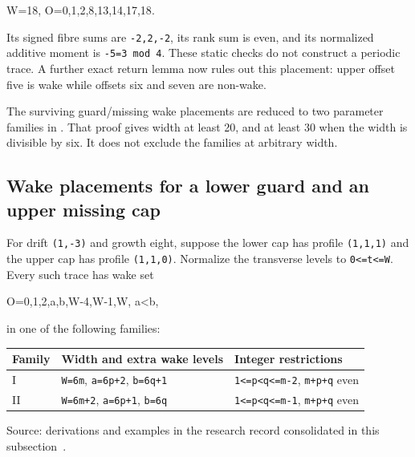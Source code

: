 \documentclass[11pt,letterpaper]{article}
\theoremstyle{plain}
\theoremstyle{definition}
\begin{document}
\begin{NoHyper}
\begin{codeblock}
W=18,       O={0,1,2,8,13,14,17,18}.
\end{codeblock}

Its signed fibre sums are \texttt{-2,2,-2}, its rank sum is even, and its normalized additive moment is \texttt{-5=3\ mod\ 4}. These static checks do not construct a periodic trace. A further exact return lemma now rules out this placement: upper offset five is wake while offsets six and seven are non-wake.

The surviving guard/missing wake placements are reduced to two parameter families in . That proof gives width at least 20, and at least 30 when the width is divisible by six. It does not exclude the families at arbitrary width.


\subsection{Wake placements for a lower guard and an upper missing cap}

For drift \texttt{(1,-3)} and growth eight, suppose the lower cap has profile \texttt{(1,1,1)} and the upper cap has profile \texttt{(1,1,0)}. Normalize the transverse levels to \texttt{0\textless{}=t\textless{}=W}. Every such trace has wake set

\begin{codeblock}
O={0,1,2,a,b,W-4,W-1,W},       a<b,
\end{codeblock}

in one of the following families:

{\def\LTcaptype{table} %
\begin{longtable}[]{@{}lll@{}}
\toprule\noalign{}
Family & Width and extra wake levels & Integer restrictions \\
\midrule\noalign{}
\endhead
\bottomrule\noalign{}
\endlastfoot
I & \texttt{W=6m}, \texttt{a=6p+2}, \texttt{b=6q+1} & \texttt{1\textless{}=p\textless{}q\textless{}=m-2}, \texttt{m+p+q} even \\
II & \texttt{W=6m+2}, \texttt{a=6p+1}, \texttt{b=6q} & \texttt{1\textless{}=p\textless{}q\textless{}=m-1}, \texttt{m+p+q} even \\
\end{longtable}
{\footnotesize Source: derivations and examples in the research record consolidated in this subsection~\cite{Repo}.\par}
}


\end{NoHyper}
\end{document}
